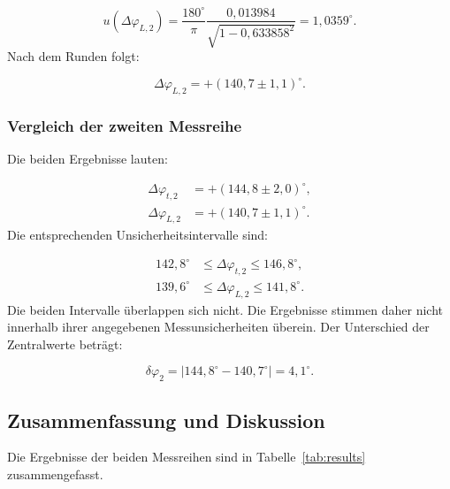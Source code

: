 \documentclass{report}
\begin{document}
\begin{equation}
u(\Delta\varphi_{L,2})
=
\frac{180^\circ}{\pi}
\frac{0{,}013984}{\sqrt{1-0{,}633858^2}}
=
1{,}0359^\circ.
\end{equation}
\noindent
Nach dem Runden folgt:

\begin{equation}
\boxed{\Delta\varphi_{L,2}=+(140{,}7\pm1{,}1)^\circ}.
\label{eq:result_lissajous_2}
\end{equation}

\subsubsection{Vergleich der zweiten Messreihe}
\noindent
Die beiden Ergebnisse lauten:

\begin{align}
\Delta\varphi_{t,2}&=+(144{,}8\pm2{,}0)^\circ,\\
\Delta\varphi_{L,2}&=+(140{,}7\pm1{,}1)^\circ.
\end{align}
\noindent
Die entsprechenden Unsicherheitsintervalle sind:

\begin{align}
142{,}8^\circ&\leq\Delta\varphi_{t,2}\leq146{,}8^\circ,\\
139{,}6^\circ&\leq\Delta\varphi_{L,2}\leq141{,}8^\circ.
\end{align}
\noindent
Die beiden Intervalle überlappen sich nicht. Die Ergebnisse stimmen daher nicht innerhalb ihrer angegebenen Messunsicherheiten überein. Der Unterschied der Zentralwerte beträgt:

\begin{equation}
\delta\varphi_2
=
|144{,}8^\circ-140{,}7^\circ|
=
4{,}1^\circ.
\end{equation}

\subsection{Zusammenfassung und Diskussion}
\noindent
Die Ergebnisse der beiden Messreihen sind in Tabelle~\ref{tab:results} zusammengefasst.
\end{document}
